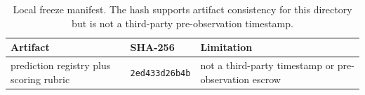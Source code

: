 \begin{table}[t]
  \caption{Local freeze manifest. The hash supports artifact consistency for
  this directory but is not a third-party pre-observation timestamp.}
  \label{tab:freeze-manifest}
  \centering\footnotesize
  \begin{tabular}{@{}p{}p{}p{}@{}}
    \toprule
    Artifact & SHA-256 & Limitation \\
    \midrule
    prediction registry plus scoring rubric & \texttt{2ed433d26b4b} & not a third-party timestamp or pre-observation escrow \\
    \bottomrule
  \end{tabular}
\end{table}

